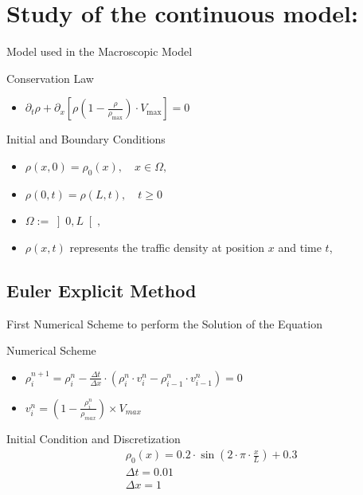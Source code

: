 \documentclass{beamer}
\begin{document}
\section{Study of the continuous model:}
\begin{frame}{Model used in the Macroscopic Model}
	\begin{alertblock}{Conservation Law}
		\begin{itemize}
			\item $\partial_t\rho + \partial_x\left[ \rho\left( 1-\frac{\rho}{\rho_{\text{max}}}\right) \cdot V_{\text{max}}\right] = 0 $
		\end{itemize}
	\end{alertblock}
	\begin{block}{Initial and Boundary Conditions}
		\begin{itemize}
			\item $\rho(x,0) = \rho_0(x), \quad x \in \Omega,$
			\item $\rho(0,t) = \rho(L,t), \quad t \geq 0$
			\item $\Omega := \left] 0,L\right[, $
			\item $\rho(x,t)$ represents the traffic density at position $x$ and time $t$, 
		\end{itemize}
	\end{block}
\end{frame}

\subsection{Euler Explicit Method}
\begin{frame}{First Numerical Scheme to perform the Solution of the Equation}
	\begin{alertblock}{Numerical Scheme}
		\begin{itemize}
			\item $\rho_{i}^{n+1} = \rho_i^n - \frac{\Delta t}{\Delta x} \cdot \left(\rho_i^n \cdot v_i^n - \rho_{i-1}^n \cdot v_{i-1}^n \right)
					=0$
		
			\item $v_i^n = \left( 1 - \frac{\rho_i^n}{\rho_{max}}\right)  \times V_{max}$
		\end{itemize}
	\end{alertblock}
	\begin{block}{Initial Condition and Discretization}
		\[
		\boxed{
			\begin{aligned}
				&\rho_0(x)=0.2 \cdot \sin\left(2 \cdot \pi \cdot \frac{x}{L}\right) + 0.3 \\
				&\Delta t = 0.01 \\
				&\Delta x = 1
			\end{aligned}
		}
		\]
	\end{block}
\end{frame}
\end{document}
